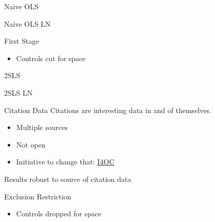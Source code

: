 \documentclass{beamer}
\begin{document}

\begin{frame}{Naive OLS}
	\begin{center}
		\scalebox{0.75}{}
	\end{center}
\end{frame}


\begin{frame}{Naive OLS LN}
	\begin{center}
		\scalebox{0.8}{}
	\end{center}
\end{frame}

\begin{frame}{First Stage}
	\begin{center}
		\scalebox{0.90}{}
	\end{center}
	
	\begin{itemize}
		\item  		Controls cut for space
	\end{itemize}
\end{frame}

\begin{frame}{2SLS}
	\begin{center}
		\scalebox{0.75}{}
	\end{center}
\end{frame}

\begin{frame}{2SLS LN}
	\begin{center}
		\scalebox{0.7}{}
	\end{center}
\end{frame}

\begin{frame}{Citation Data}
Citations are interesting data in and of themselves.
\begin{itemize}
\item Multiple sources
\item Not open
\item Initiative to change that: \href{http://i4oc.org}{I4OC}
\end{itemize}
Results robust to source of citation data
\end{frame}

\begin{frame}{Exclusion Restriction}
	\scalebox{0.61}{}
	\begin{itemize}
		\item Controls dropped for space
	\end{itemize}
\end{frame}
\end{document}
